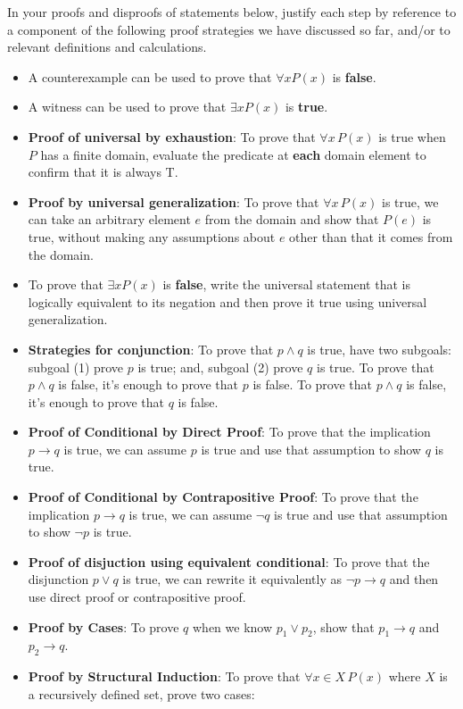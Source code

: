 \documentclass[12pt, oneside]{article}
\begin{document}
In your proofs and disproofs of statements below, justify each  step
by reference to  a component of the  following proof  strategies
we  have discussed so far, and/or to relevant definitions and calculations.
\begin{itemize}
    \item A counterexample can be used to prove that  $\forall x P(x)$ is {\bf false}.
    \item  A witness can be used to prove that  $\exists x P(x)$ is {\bf true}.
    \item {\bf Proof of universal by exhaustion}: To prove that $\forall x \, P(x)$
is true when $P$ has a finite domain, evaluate the predicate at {\bf each} domain element to confirm that it is always T.
    \item  {\bf Proof by universal generalization}: To prove that $\forall x \, P(x)$
is true, we can take an arbitrary element $e$ from the domain and show that $P(e)$ is true, without making any assumptions 
about $e$ other than that it comes from the domain.
    \item To  prove  that $\exists x P(x)$ is {\bf false}, write the universal statement that is 
    logically equivalent to its negation and then prove it true using universal generalization.
    \item {\bf Strategies for conjunction}: To prove that $p \land q$ is true, have two subgoals: 
    subgoal (1) prove $p$ 
is  true; and, subgoal (2) prove $q$ is true. To prove that $p \land q$ is false, it's enough to prove that $p$ is false.
 To prove that $p \land q$ is false, it's enough to prove that $q$ is false.
    \item {\bf Proof of Conditional by Direct Proof}: To prove that the implication $p \to q$ is true, 
    we can assume $p$ is true and use that assumption to show $q$ is true.
    \item {\bf Proof of Conditional by Contrapositive Proof}: To prove that the implication $p \to q$ is true, 
    we can assume $\neg q$ is true and use that assumption to show $\neg p$ is true.
    \item {\bf Proof of disjuction using equivalent conditional}: To prove that the 
    disjunction $p \lor q$ is true, we can rewrite it equivalently as $\lnot p \to q$ and
    then use direct proof or contrapositive proof.
    \item {\bf Proof by Cases}: To prove $q$ when we know $p_1 \lor p_2$, show that $p_1 \to q$ and $p_2 \to q$.
    \item
    {\bf Proof by Structural Induction}: To prove that $\forall x \in X \, P(x)$ where $X$ is a recursively defined set, prove two cases:
        

\end{itemize}
\end{document}
